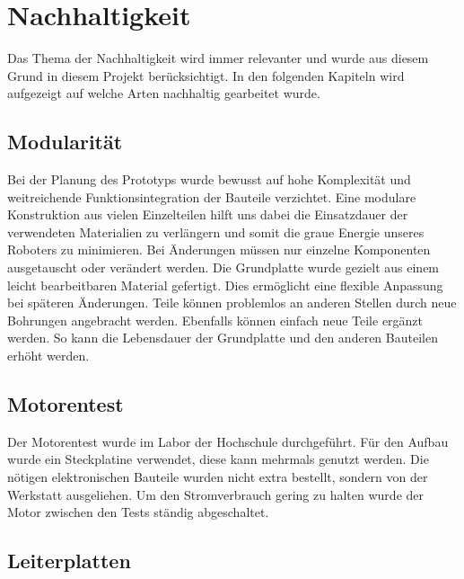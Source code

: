 \section{Nachhaltigkeit}
\label{section:Nachhaltigkeit}

Das Thema der Nachhaltigkeit wird immer relevanter und wurde aus diesem Grund in diesem Projekt berücksichtigt. In den folgenden Kapiteln wird aufgezeigt auf welche Arten nachhaltig gearbeitet wurde.

\subsection{Modularität}
Bei der Planung des Prototyps wurde bewusst auf hohe Komplexität und weitreichende Funktionsintegration der Bauteile verzichtet. Eine modulare Konstruktion aus vielen Einzelteilen hilft uns dabei die Einsatzdauer der verwendeten Materialien zu verlängern und somit die graue Energie unseres Roboters zu minimieren. Bei Änderungen müssen nur einzelne Komponenten ausgetauscht oder verändert werden. Die Grundplatte wurde gezielt aus einem leicht bearbeitbaren Material gefertigt. Dies ermöglicht eine flexible Anpassung bei späteren Änderungen. Teile können problemlos an anderen Stellen durch  neue Bohrungen angebracht werden. Ebenfalls können einfach neue Teile ergänzt werden. So kann die Lebensdauer der Grundplatte und den anderen Bauteilen erhöht werden. 


\subsection{Motorentest}

Der Motorentest wurde im Labor der Hochschule durchgeführt. Für den Aufbau wurde ein Steckplatine verwendet, diese kann mehrmals genutzt werden. Die nötigen elektronischen Bauteile wurden nicht extra bestellt, sondern von der Werkstatt ausgeliehen. Um den Stromverbrauch gering zu halten wurde der Motor zwischen den Tests ständig abgeschaltet. 

\subsection{Leiterplatten}
\label{Leiterplatten}

